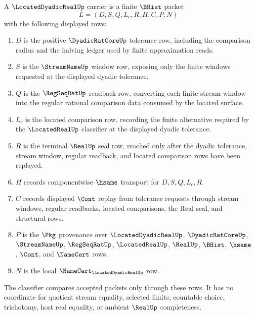 \begin{definition}
\label{def:located-dyadic-real-carrier}
A $\LocatedDyadicRealUp$ carrier is a finite $\BHist$ packet
$$
L=(D,S,Q,L_c,R,H,C,P,N)
$$
with the following displayed rows:
\begin{enumerate}
\item $D$ is the positive $\DyadicRatCoreUp$ tolerance row, including the comparison radius and the halving ledger used by finite approximation reads.
\item $S$ is the $\StreamNameUp$ window row, exposing only the finite windows requested at the displayed dyadic tolerance.
\item $Q$ is the $\RegSeqRatUp$ readback row, converting each finite stream window into the regular rational comparison data consumed by the located surface.
\item $L_c$ is the located comparison row, recording the finite alternative required by the $\LocatedRealUp$ classifier at the displayed dyadic tolerance.
\item $R$ is the terminal $\RealUp$ seal row, reached only after the dyadic tolerance, stream window, regular readback, and located comparison rows have been replayed.
\item $H$ records componentwise $\hsame$ transport for $D,S,Q,L_c,R$.
\item $C$ records displayed $\Cont$ replay from tolerance requests through stream windows, regular readbacks, located comparisons, the Real seal, and structural rows.
\item $P$ is the $\Pkg$ provenance over $\LocatedDyadicRealUp$, $\DyadicRatCoreUp$, $\StreamNameUp$, $\RegSeqRatUp$, $\LocatedRealUp$, $\RealUp$, $\BHist$, $\hsame$, $\Cont$, and $\NameCert$ rows.
\item $N$ is the local $\NameCert_{\LocatedDyadicRealUp}$ row.
\end{enumerate}
The classifier compares accepted packets only through these rows. It has no coordinate for quotient stream equality, selected limits, countable choice, trichotomy, host real equality, or ambient $\RealUp$ completeness.
\end{definition}

